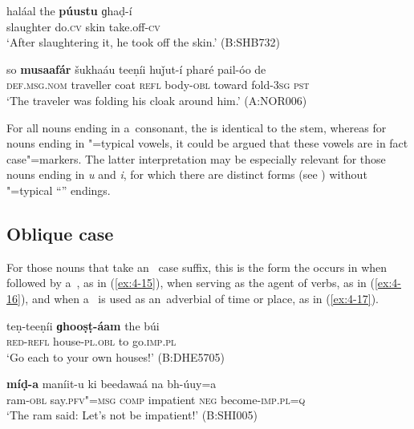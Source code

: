 \begin{exe}
\ex
\label{ex:4-14}
\gll haláal the \textbf{púustu} ɡhaḍ-í \\
	slaughter do.\textsc{cv} skin take.off-\textsc{cv} \\
\glt `After slaughtering it, he took off the skin.' (B:SHB732)
\end{exe}

\begin{exe}
\ex
\label{ex:4-14b}
\gll so \textbf{musaafár} šukhaáu teeṇíi huǰut-í pharé pail-óo de \\
	\textsc{def.msg.nom} traveller coat \textsc{refl} body-\textsc{obl} toward fold-\textsc{3sg} \textsc{pst} \\
\glt `The traveler was folding his cloak around him.' (A:NOR006)
\end{exe}


For all nouns ending in a~consonant, the  is identical to the  stem, whereas for nouns ending in "=typical vowels, it could be argued that these vowels are in fact  case"=markers. The latter interpretation may be especially relevant for those nouns ending in \textit{u} and \textit{i}, for which there are distinct  forms (see ) without "=typical ``'' endings.

\subsection{Oblique case}
\label{subsec:4-5-2}

For those nouns that take an~ case suffix, this is the form the  occurs in when followed by a~, as in (\ref{ex:4-15}), when serving as the agent of   verbs, as in (\ref{ex:4-16}), and when a~ is used as an~adverbial of time or place, as in (\ref{ex:4-17}). 


\begin{exe}
\ex
\label{ex:4-15}
\gll teṇ-teeṇíi \textbf{ɡhooṣṭ-áam} the búi\\
	\textsc{red}-\textsc{refl} house-\textsc{pl.obl} to go.\textsc{imp.pl} \\
\glt `Go each to your own houses!' (B:DHE5705)
\end{exe}

\begin{exe}
\ex
\label{ex:4-16}
\gll \textbf{míḍ-a} maníit-u ki beedawaá na bh-úuy=a \\
	ram-\textsc{obl} say.\textsc{pfv"=msg} \textsc{comp} impatient \textsc{neg} become-\textsc{imp.pl=q} \\
\glt `The ram said: Let's not be impatient!' (B:SHI005)
\end{exe}

